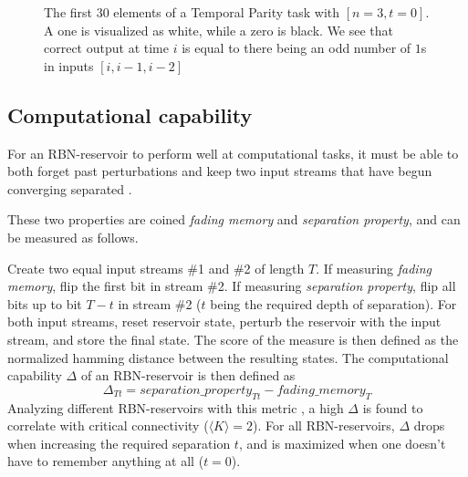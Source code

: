 \begin{figure}


  \caption[The first elements of the temporal parity task]{
    The first 30 elements of a Temporal Parity task with $[n=3, t=0]$.
    A one is visualized as white, while a zero is black.
    We see that correct output at time $i$ is equal to there being an odd number of $1$s in inputs $[i, i-1, i-2]$
  }
  \label{figure:temporal-parity}
\end{figure}

\subsection{Computational capability}
\label{section:computational-capability}
For an RBN-reservoir to perform well at computational tasks,
it must be able to both forget past perturbations and keep two input streams that have begun converging separated \cite{bertschinger2004real}.

These two properties are coined \textit{fading memory} and \textit{separation property},
and can be measured \cite{rbn-reservoir} as follows.

Create two equal input streams \#1 and \#2 of length $T$.
If measuring \textit{fading memory}, flip the first bit in stream \#2.
If measuring \textit{separation property}, flip all bits up to bit $T-t$ in stream \#2
($t$ being the required depth of separation).
For both input streams, reset reservoir state, perturb the reservoir with the input stream,
and store the final state.
The score of the measure is then defined as the normalized hamming distance between the resulting states.
The computational capability $\Delta$ of an RBN-reservoir is then defined as
\begin{equation}
  \Delta_{Tt} = separation\_property_{Tt} - fading\_memory_{T}
\label{formula:accuracy}
\end{equation}
Analyzing different RBN-reservoirs with this metric \cite{rbn-reservoir},
a high $\Delta$ is found to correlate with critical connectivity ($\langle K \rangle = 2$).
For all RBN-reservoirs, $\Delta$ drops when increasing the required separation $t$,
and is maximized when one doesn't have to remember anything at all ($t=0$).

